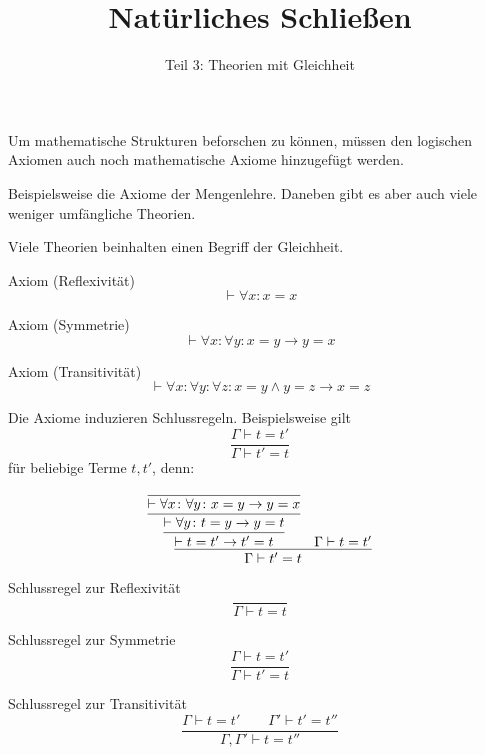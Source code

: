 \documentclass[8pt]{beamer}
\title{Natürliches Schließen}
\subtitle{Teil 3: Theorien mit Gleichheit}
\date{}
\newcommand{\parspace}{\vspace{0.8em}}
\newcommand{\cond}{\rightarrow}
\begin{document}
\begin{frame}
\maketitle
\end{frame}

\begin{frame}
Um mathematische Strukturen beforschen zu können, müssen den
logischen Axiomen auch noch mathematische Axiome hinzugefügt
werden.

\parspace
Beispielsweise die Axiome der Mengenlehre. Daneben gibt es aber auch
viele weniger umfängliche Theorien.

\parspace
Viele Theorien beinhalten einen Begriff der Gleichheit.
\end{frame}

\begin{frame}
\begin{block}{Axiom (Reflexivität)}
\[\vdash\forall x\colon x=x\]
\end{block}\pause

\begin{block}{Axiom (Symmetrie)}
\[\vdash\forall x\colon\forall y\colon x=y\cond y=x\]
\end{block}\pause

\begin{block}{Axiom (Transitivität)}
\[\vdash\forall x\colon\forall y\colon\forall z\colon x=y\land y=z\cond x=z\]
\end{block}
\end{frame}

\begin{frame}
Die Axiome induzieren Schlussregeln. Beispielsweise gilt
\[\dfrac{\Gamma\vdash t=t'}{\Gamma\vdash t'=t}\]
für beliebige Terme $t,t'$, denn:

\[
\infer{\Gamma\vdash t'=t}{
  \infer{\vdash t=t'\cond t'=t}{
    \infer{\vdash\forall y\colon t=y\cond y=t}{
      \infer{\vdash\forall x\colon\forall y\colon x=y\cond y=x}{}}}
& \Gamma\vdash t=t'}
\]
\end{frame}

\begin{frame}
\begin{block}{Schlussregel zur Reflexivität}
\[\dfrac{}{\Gamma\vdash t=t}\]
\end{block}\pause

\begin{block}{Schlussregel zur Symmetrie}
\[\dfrac{\Gamma\vdash t=t'}{\Gamma\vdash t'=t}\]
\end{block}\pause

\begin{block}{Schlussregel zur Transitivität}
\[\dfrac{\Gamma\vdash t=t'\qquad\Gamma'\vdash t'=t''}{\Gamma,\Gamma'\vdash t=t''}\]
\end{block}
\end{frame}
\end{document}
